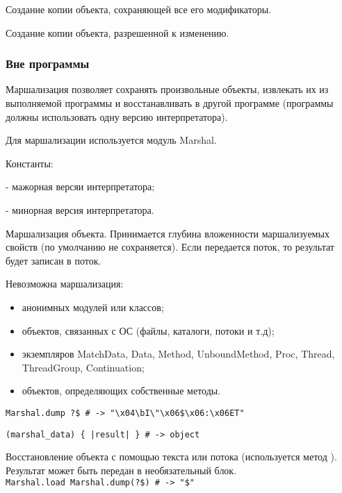 \begin{methodlist}
  Создание копии объекта, сохраняющей все его модификаторы. 

  Создание копии объекта, разрешенной к изменению.
\end{methodlist}

\subsubsection*{Вне программы}

Маршализация позволяет сохранять произвольные объекты, извлекать их из выполняемой программы и восстанавливать в другой программе (программы должны использовать одну версию интерпретатора).

Для маршализации используется модуль Marshal.

\begin{keylist}{Константы:}
  
   - мажорная версяи интерпретатора;
  
   - минорная версия интерпретатора.
\end{keylist}

\begin{methodlist}
  Маршализация объекта. Принимается глубина вложенности маршализуемых свойств (по умолчанию не сохраняется). Если передается поток, то результат будет записан в поток.

  Невозможна маршализация:
  \begin{itemize}
    \item анонимных модулей или классов;
    \item объектов, связанных с ОС (файлы, каталоги, потоки и т.д);
    \item экземпляров MatchData, Data, Method, UnboundMethod, Proc, Thread, ThreadGroup, Continuation;
    \item объектов, определяющих собственные методы.
  \end{itemize}
  \verb!Marshal.dump ?$ # -> "\x04\bI\"\x06$\x06:\x06ET"!

  \verb!(marshal_data) { |result| } # -> object!
  
  Восстановление объекта с помощью текста или потока (используется метод ). Результат может быть передан в необязательный блок.
  \\\verb!Marshal.load Marshal.dump(?$) # -> "$"!
\end{methodlist}